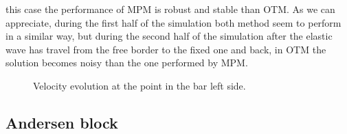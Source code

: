 this case the performance of MPM is robust and stable than OTM. As we
can appreciate, during the first half of the simulation both method
seem to perform in a similar way, but during the second half of the
simulation after the elastic wave has travel from the free border to
the fixed one and back, in OTM the solution becomes noisy than the
one performed by MPM.  
\begin{figure}\sidecaption
  \centering
  \caption{Velocity evolution at the point in the bar left side.}
  \label{fig:Dyka-OTM-MPM}
\end{figure}

\subsection{Andersen block}
\label{sec:andersen-block}

